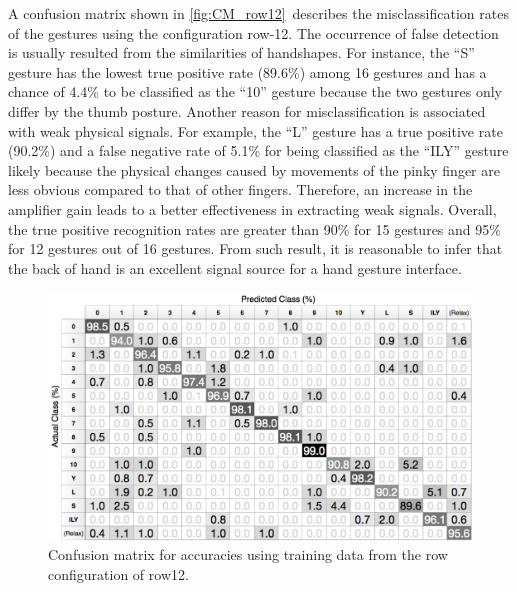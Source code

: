 \documentclass{sigchi}
\begin{document}
A confusion matrix shown in \autoref{fig:CM_row12}\ describes the misclassification rates of the gestures using the configuration row-12.
The occurrence of false detection is usually resulted from the similarities of handshapes.
For instance, the ``S'' gesture has the lowest true positive rate (89.6\%) among 16 gestures and has a chance of 4.4\% to be classified as the ``10'' gesture because the two gestures only differ by the thumb posture.
Another reason for misclassification is associated with weak physical signals.
For example, the ``L'' gesture has a true positive rate (90.2\%) and a false negative rate of 5.1\% for being classified as the ``ILY'' gesture likely because the  physical changes caused by movements of the pinky finger are less obvious compared to that of other fingers. Therefore, an increase in the amplifier gain leads to a better effectiveness in extracting weak signals.
Overall, the true positive recognition rates are greater than 90\% for 15 gestures and 95\% for 12 gestures out of 16 gestures. From such result, it is reasonable to infer that the back of hand is an excellent signal source for a hand gesture interface.
\begin{figure}[hb]
  \begin{center}
  \includegraphics[width=1\columnwidth]{figures/CM_row12_v2.pdf}
  \caption{Confusion matrix for accuracies using training data from the row configuration of row12.}
  \label{fig:CM_row12}
  \end{center}
\end{figure}
\end{document}
